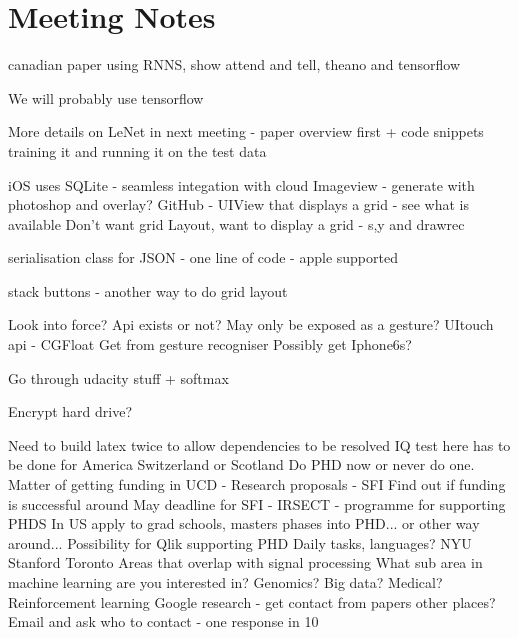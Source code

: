 \documentclass[]{weekly-report}
\begin{document}
\section{Meeting Notes}
canadian paper using RNNS, show attend and tell, theano and tensorflow

We will probably use tensorflow

More details on LeNet in next meeting - paper overview first + code snippets
training it and running it on the test data

iOS uses SQLite - seamless integation with cloud
Imageview - generate with photoshop and overlay?
GitHub - UIView that displays a grid - see what is available
Don't want grid Layout, want to display a grid - s,y and drawrec

serialisation class for JSON - one line of code - apple supported

stack buttons - another way to do grid layout

Look into force? Api exists or not? May only be exposed as a gesture?
UItouch api - CGFloat
Get from gesture recogniser
Possibly get Iphone6s?

Go through udacity stuff + softmax

Encrypt hard drive?

Need to build latex twice to allow dependencies to be resolved
IQ test here has to be done for America
Switzerland or Scotland
Do PHD now or never do one.
Matter of getting funding in UCD - Research proposals - SFI
Find out if funding is successful around May
deadline for SFI - IRSECT - programme for supporting PHDS
In US apply to grad schools, masters phases into PHD... or other way around...
Possibility for Qlik supporting PHD
Daily tasks, languages? 
NYU
Stanford 
Toronto
Areas that overlap with signal processing
What sub area in machine learning are you interested in? Genomics? Big data? Medical? Reinforcement learning
Google research - get contact from papers other places? Email and ask who to contact - one response in 10


{}



\label{last_page}

 
\end{document}

